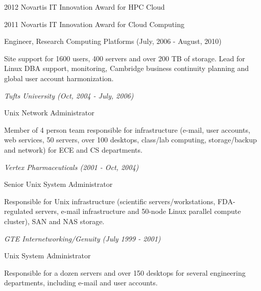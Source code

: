 \documentclass[11pt,article,oneside]{memoir}
\begin{document}
\ind \hspace{0.35in} \footnotesize 2012 Novartis IT Innovation Award for HPC Cloud

\ind \hspace{0.35in} \footnotesize 2011 Novartis IT Innovation Award for Cloud Computing

\medskip

\ind \footnotesize Engineer, Research Computing Platforms (July, 2006 - August, 2010)

\ind \hspace{0.35in} \footnotesize Site support for 1600 users, 400 servers and over 200 TB of storage. Lead for Linux DBA support, monitoring, Cambridge business continuity planning and global user account harmonization.

\vspace{-0.075in}

\normalsize

\bigskip
\noindent\emph{Tufts University (Oct, 2004 - July, 2006) \vspace{0.05in}}

\ind \footnotesize Unix Network Administrator

\ind \hspace{0.35in} \footnotesize Member of 4 person team responsible for infrastructure (e-mail, user accounts, web services, 50 servers, over 100 desktops, class/lab computing, storage/backup and network) for ECE and CS departments.

\vspace{-0.075in}

\normalsize

\bigskip
\noindent\emph{Vertex Pharmaceuticals (2001 - Oct, 2004) \vspace{0.05in}}

\ind \footnotesize Senior Unix System Administrator

\ind \hspace{0.35in} \footnotesize Responsible for Unix infrastructure (scientific servers/workstations, FDA-regulated servers, e-mail infrastructure and 50-node Linux parallel compute cluster), SAN and NAS storage.

\vspace{-0.075in}

\normalsize

\bigskip
\noindent\emph{GTE Internetworking/Genuity (July 1999 - 2001)}

\ind \footnotesize Unix System Administrator

\ind \hspace{0.35in} \footnotesize Responsible for a dozen servers and over 150 desktops for several engineering departments, including e-mail and user accounts.
\end{document}
